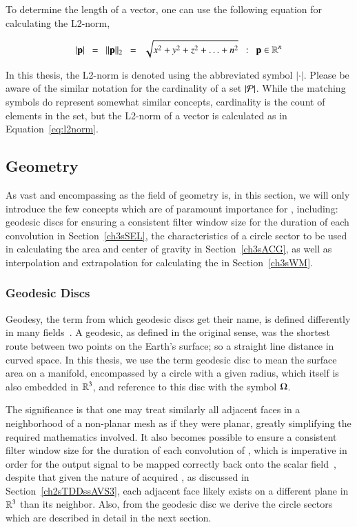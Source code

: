 To determine the length of a vector, one can use the following equation for calculating the L2-norm,

\begin{equation}
	|\mathbf{p}| \enspace=\enspace \|\mathbf{p}\|_2 \enspace=\enspace \sqrt{x^2 + y^2 + z^2 + \ldots + n^2} \enspace:\enspace \mathbf{p} \in \mathbb{R}^{n}
	\label{eq:l2norm}
\end{equation}

In this thesis, the L2-norm is denoted using the abbreviated symbol $|\cdot|$. Please be aware of the similar notation for the cardinality of a set $|\mathcal{P}|$. While the matching symbols do represent somewhat similar concepts, cardinality is the count of elements in the set, but the L2-norm of a vector is calculated as in Equation~\ref{eq:l2norm}.~\cite[p.~26]{Mara12}

%
%
%
%
\subsection{Geometry}
\label{ch2sETBssG}
As vast and encompassing as the field of geometry is, in this section, we will only introduce the few concepts which are of paramount importance for , including: geodesic discs for ensuring a consistent filter window size for the duration of each convolution in Section~\ref{ch3sSEL}, the characteristics of a circle sector to be used in calculating the area and center of gravity in Section~\ref{ch3sACG}, as well as interpolation and extrapolation for calculating the  in Section~\ref{ch3sWM}.

%
%
\subsubsection{Geodesic Discs}
\label{ch2sETBssGsssGD}
Geodesy, the term from which geodesic discs get their name, is defined differently in many fields~\cite{EB3}. A geodesic, as defined in the original sense, was the shortest route between two points on the Earth's surface; so a straight line distance in curved space. In this thesis, we use the term geodesic disc to mean the surface area on a manifold, encompassed by a circle with a given radius, which itself is also embedded in $\mathbb{R}^{3}$, and reference to this disc with the symbol $\Omega$.

The significance is that one may treat similarly all adjacent faces in a neighborhood of a non-planar mesh as if they were planar, greatly simplifying the required mathematics involved. It also becomes possible to ensure a consistent filter window size for the duration of each convolution of , which is imperative in order for the output signal to be mapped correctly back onto the scalar field~\cite[p.~106-112]{Jaehne97}, despite that given the nature of acquired \tdd{}, as discussed in Section~\ref{ch2sTDDssAVS3}, each adjacent face likely exists on a different plane in $\mathbb{R}^{3}$ than its neighbor.  Also, from the geodesic disc we derive the circle sectors which are described in detail in the next section.
%
%

